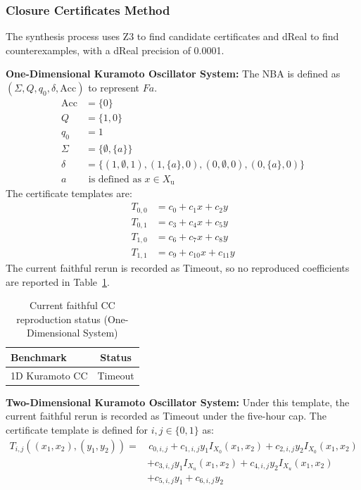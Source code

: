 \subsubsection{Closure Certificates Method}
The synthesis process uses Z3 to find candidate certificates and dReal to find counterexamples, with a dReal precision of 0.0001.

\textbf{One-Dimensional Kuramoto Oscillator System:}
The NBA is defined as $(\Sigma, Q, q_0, \delta, \text{Acc})$ to represent $F a$.
\begin{align*}
    \text{Acc} &= \{0\} \\
    Q &= \{1, 0\} \\
    q_0 &= 1 \\
    \Sigma &= \{\emptyset, \{a\}\} \\
    \delta &= \{(1, \emptyset, 1), (1, \{a\}, 0), (0, \emptyset, 0), (0, \{a\}, 0)\} \\
	a &\text{ is defined as } x \in X_{\text{u}}
\end{align*}
The certificate templates are:
\begin{align*}
    T_{0,0} &= c_0 + c_1 x + c_2 y \\
    T_{0,1} &= c_3 + c_4 x + c_5 y \\
    T_{1,0} &= c_6 + c_7 x + c_8 y \\
    T_{1,1} &= c_9 + c_{10} x + c_{11} y
\end{align*}
The current faithful rerun is recorded as Timeout, so no reproduced coefficients are reported in Table~\ref{tab:coeff_1d}.


\begin{table}[h]
\centering
\caption{Current faithful CC reproduction status (One-Dimensional System)}
\label{tab:coeff_1d}
\begin{tabular}{lc}
\hline
\textbf{Benchmark} & \textbf{Status} \\
\hline
1D Kuramoto CC & Timeout \\
\hline
\end{tabular}
\end{table}

\textbf{Two-Dimensional Kuramoto Oscillator System:}
Under this template, the current faithful rerun is recorded as Timeout under the five-hour cap.
The certificate template is defined for $i, j \in \{0, 1\}$ as:
\begin{align*}
T_{i,j}((x_1, x_2), (y_1, y_2)) = &\, c_{0, i, j} + c_{1, i, j} y_1 I_{X_0}(x_1, x_2) + c_{2, i, j} y_2 I_{X_0}(x_1, x_2) \\
                                  &+ c_{3, i, j} y_1 I_{X_u}(x_1, x_2) + c_{4, i, j} y_2 I_{X_u}(x_1, x_2) \\
                                  &+ c_{5,i,j} y_1 + c_{6,i,j} y_2
\end{align*}

